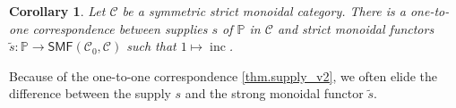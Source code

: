 \documentclass[11pt, oneside, article]{memoir}
\theoremstyle{plain}
\newtheorem{corollary}[theorem]{Corollary}
\theoremstyle{definition}
\theoremstyle{remark}
\newcommand{\cat}[1]{\mathcal{#1}}%
\newcommand{\Cat}[1]{{\mathsf{#1}}}%
\DeclareMathOperator{\inc}{inc}
\newcommand{\tpow}[1]{^{\otimes #1}}
\newcommand{\smf}{\Cat{SMF}}
\newcommand{\pp}{\mathbb{P}}
\newcommand{\mob}[1]{#1_0}
\begin{document}
% 
%
% 

\begin{corollary}\label{cor.strict_supply_v2}
Let $\cat{C}$ be a symmetric strict monoidal category. There is a one-to-one correspondence between supplies $s$ of $\pp$ in $\cat{C}$ and strict monoidal functors $\tilde{s}\colon\pp\to\smf(\mob{\cat{C}},\cat{C})$ such that $1 \mapsto \inc$.
\end{corollary}

Because of the one-to-one correspondence \cref{thm.supply_v2}, we often elide the difference between the supply $s$ and the strong monoidal functor $\tilde{s}$. 
\end{document}
